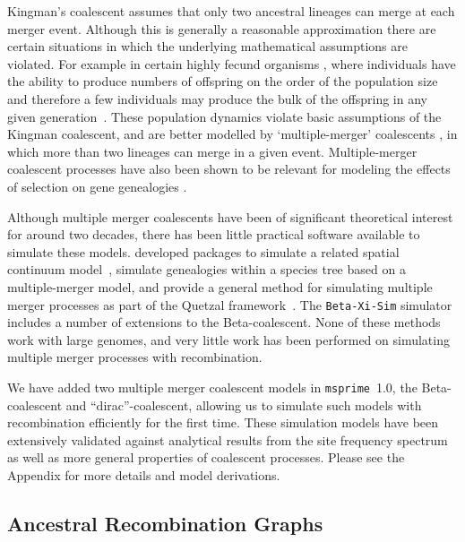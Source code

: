 \documentclass{article}
\newcommand{\msprime}[0]{\texttt{msprime}}
\begin{document}
Kingman's coalescent assumes that only two ancestral lineages can merge at
each merger event. Although this is generally a reasonable approximation there
are certain situations in which the underlying mathematical assumptions are
violated. For example in certain highly fecund organisms
\citep{hedgecock_94,B94,HP11,A04,irwin16}, where individuals have the ability
to produce numbers of offspring on the order of the population size and
therefore a few individuals may produce the bulk of the offspring in any given
generation~\citep{hedgecock_94}. These population dynamics violate basic
assumptions of the Kingman coalescent, and are better modelled by
`multiple-merger' coalescents \citep{DK99,P99,S99,S00,MS01}, in which more than
two lineages can merge in a given event. Multiple-merger coalescent processes
have also been shown to be relevant for modeling the effects of selection on
gene genealogies \citep{Gillespie909,DS04}.

Although multiple merger coalescents have been of significant theoretical
interest for around two decades, there has been little practical software
available to simulate these models.
\cite{kelleher2013coalescent,kelleher2014coalescent} developed packages to
simulate a related spatial continuum model~\citep{barton2010new},
\cite{zhu2015hybrid} simulate genealogies within a species tree
based on a multiple-merger model, and
\cite{becheler2020occupancy} provide a general method for simulating
multiple merger processes
as part of the Quetzal framework~\citep{becheler2019quetzal}.
The \texttt{Beta-Xi-Sim} simulator~\citep{koskela2018multi,koskela2019robust}
includes a number of extensions to the Beta-coalescent.
None of these methods work with large genomes, and very little work
has been performed on simulating multiple merger processes with recombination.

We have added two multiple merger coalescent models in \msprime\ 1.0, the
Beta-coalescent and ``dirac''-coalescent, allowing us to simulate
such models with recombination efficiently for the first time.
These simulation models have been extensively validated against
analytical results from the site frequency
spectrum~\citep{birkner2013statistical,blath2016site,hobolth2019phase}
 as well as more general properties of coalescent processes.
Please see the Appendix for more details and model derivations.

\subsection*{Ancestral Recombination Graphs}
\label{sec-arg}
\end{document}
